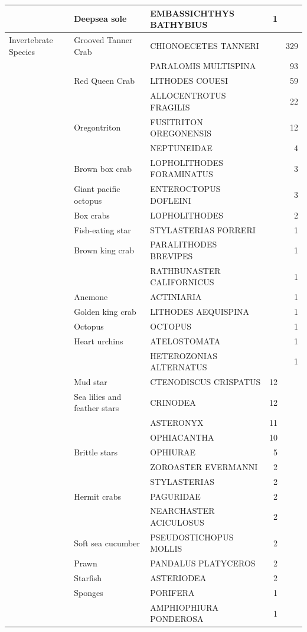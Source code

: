 \documentclass[12pt]{article}\usepackage[]{graphicx}\usepackage[]{color}
\begin{document}
\begin{longtable}[l]{lllrr}
 & Deepsea sole & EMBASSICHTHYS BATHYBIUS & 1 & \\
\midrule
Invertebrate Species & Grooved Tanner Crab & CHIONOECETES TANNERI &  & 329\\
 &  & PARALOMIS MULTISPINA &  & 93\\
 & Red Queen Crab & LITHODES COUESI &  & 59\\
 &  & ALLOCENTROTUS FRAGILIS &  & 22\\
 & Oregontriton & FUSITRITON OREGONENSIS &  & 12\\
 &  & NEPTUNEIDAE &  & 4\\
 & Brown box crab & LOPHOLITHODES FORAMINATUS &  & 3\\
 & Giant pacific octopus & ENTEROCTOPUS DOFLEINI &  & 3\\
 & Box crabs & LOPHOLITHODES &  & 2\\
 & Fish-eating star & STYLASTERIAS FORRERI &  & 1\\
 & Brown king crab & PARALITHODES BREVIPES &  & 1\\
 &  & RATHBUNASTER CALIFORNICUS &  & 1\\
 & Anemone & ACTINIARIA &  & 1\\
 & Golden king crab & LITHODES AEQUISPINA &  & 1\\
 & Octopus & OCTOPUS &  & 1\\
 & Heart urchins & ATELOSTOMATA &  & 1\\
 &  & HETEROZONIAS ALTERNATUS &  & 1\\
 & Mud star & CTENODISCUS CRISPATUS & 12 & \\
 & Sea lilies and feather stars & CRINODEA & 12 & \\
 &  & ASTERONYX & 11 & \\
 &  & OPHIACANTHA & 10 & \\
 & Brittle stars & OPHIURAE & 5 & \\
 &  & ZOROASTER EVERMANNI & 2 & \\
 &  & STYLASTERIAS & 2 & \\
 & Hermit crabs & PAGURIDAE & 2 & \\
 &  & NEARCHASTER ACICULOSUS & 2 & \\
 & Soft sea cucumber & PSEUDOSTICHOPUS MOLLIS & 2 & \\
 & Prawn & PANDALUS PLATYCEROS & 2 & \\
 & Starfish & ASTERIODEA & 2 & \\
 & Sponges & PORIFERA & 1 & \\
 &  & AMPHIOPHIURA PONDEROSA & 1 & \\

\end{longtable}
\end{document}
